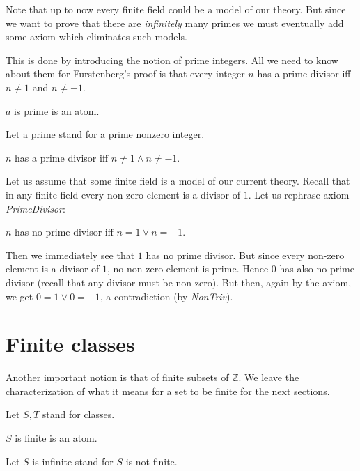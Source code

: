 \documentclass{article}
\newcommand{\Int}{\mathbb{Z}}
\begin{document}
  Note that up to now every finite field could be a model of our theory. But since we want to prove
  that there are \textit{infinitely} many primes we must eventually add some axiom which eliminates
  such models.

  This is done by introducing the notion of prime integers. All we need to know about them for
  Furstenberg's proof is that every integer $n$ has a prime divisor iff $n \neq 1$ and $n \neq -1$.

  \begin{forthel}
    \begin{signature}\label{Prime}
      $a$ is prime is an atom.
    \end{signature}

    Let a prime stand for a prime nonzero integer.

    \begin{axiom}\label{PrimeDivisor}
      $n$ has a prime divisor iff $n \neq 1 \wedge n \neq -1$.
    \end{axiom}
  \end{forthel}

  Let us assume that some finite field is a model of our current theory. Recall that in any finite
  field every non-zero element is a divisor of $1$. Let us rephrase axiom \textit{PrimeDivisor}:

  \begin{center}
    $n$ has no prime divisor iff $n = 1 \vee n = -1$.
  \end{center}

  Then we immediately see that $1$ has no prime divisor. But since every non-zero element is a
  divisor of $1$, no non-zero element is prime. Hence $0$ has also no prime divisor (recall that any
  divisor must be non-zero). But then, again by the axiom, we get $0 = 1 \vee 0 = -1$, a
  contradiction (by \textit{NonTriv}).

  \section{Finite classes}

  Another important notion is that of finite subsets of $\Int$. We leave the characterization of
  what it means for a set to be finite for the next sections.

  \begin{forthel}
    Let $S,T$ stand for classes.

    \begin{signature}\label{FinSet}
      $S$ is finite is an atom.
    \end{signature}

    Let $S$ is infinite stand for $S$ is not finite.
  \end{forthel}
\end{document}
